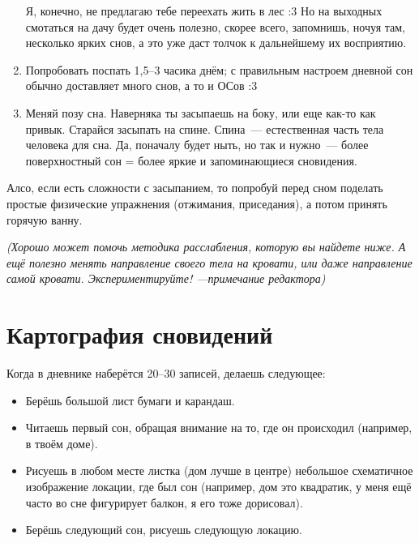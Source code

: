 \documentclass[a4paper,14pt,oneside]{memoir}
\begin{document}
\begin{enumerate}
Я, конечно, не предлагаю тебе переехать жить в лес :3 Но на выходных смотаться на дачу будет очень полезно, скорее всего, запомнишь, ночуя там, несколько ярких снов, а это уже даст толчок к дальнейшему их восприятию.  
\item Попробовать поспать 1,5--3 часика днём; с правильным настроем дневной сон обычно доставляет много снов, а то и ОСов :3
\item Меняй позу сна. Наверняка ты засыпаешь на боку, или еще как-то как привык. Старайся засыпать на спине. Спина~--- естественная часть тела человека для сна. Да, поначалу будет ныть, но так и нужно~--- более поверхностный сон = более яркие и запоминающиеся сновидения. 
\end{enumerate}

Алсо, если есть сложности с засыпанием, то попробуй перед сном поделать простые физические упражнения (отжимания, приседания), а потом принять горячую ванну. 

\textit{(Хорошо может помочь методика расслабления, которую вы найдете ниже. А ещё полезно менять направление своего тела на кровати, или даже направление самой кровати. Экспериментируйте! ---примечание редактора)}






\chapter{Картография сновидений}
Когда в дневнике наберётся 20--30 записей, делаешь следующее:
\begin{itemize}
\item Берёшь большой лист бумаги и карандаш.
\item Читаешь первый сон, обращая внимание на то, где он происходил (например, в твоём доме).
\item Рисуешь в любом месте листка (дом лучше в центре) небольшое схематичное изображение локации, где был сон (например, дом это квадратик, у меня ещё часто во сне фигурирует балкон, я его тоже дорисовал).
\item Берёшь следующий сон, рисуешь следующую локацию.
\end{itemize}
\end{document}
